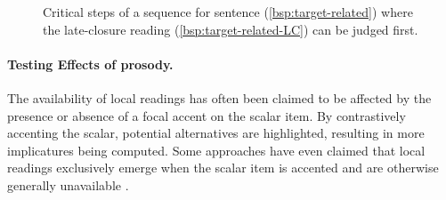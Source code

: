 \documentclass[fleqn,reqno,10pt,draft]{article}
\begin{document}
\begin{figure}[ht]
	\centering
	\caption[]{Critical steps of a sequence for sentence
          (\ref{bsp:target-related}) where the late-closure reading
          (\ref{bsp:target-related-LC}) can be judged first.}
	\label{fig:exec}
\end{figure}

\paragraph{Testing Effects of prosody.} 
  
The availability of local readings has often been claimed to be
affected by the presence or absence of a focal accent on the scalar
item. By contrastively accenting the scalar, potential alternatives
are highlighted, resulting in more implicatures being computed. Some 
approaches have even claimed that local readings exclusively 
emerge when the scalar item is accented and are otherwise generally
unavailable \citep[e.g.][]{Horn2006:The-Border-Wars,
Geurts2009:Scalar-Implicat,Geurts2010:Quantity-Implic,
Tielvan-Tiel2012:Embedded-Scalar}.
\end{document}
